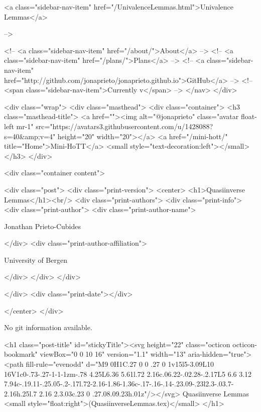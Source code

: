       
    
      
        
          <a class="sidebar-nav-item" href="/UnivalenceLemmas.html">Univalence Lemmas</a>
        
      
     -->

    <!-- <a class="sidebar-nav-item" href="/about/">About</a> -->
    <!-- <a class="sidebar-nav-item" href="/plans/">Plans</a> -->
    <!-- <a class="sidebar-nav-item" href="http://github.com/jonaprieto/jonaprieto.github.io">GitHub</a> -->
    <!-- <span class="sidebar-nav-item">Currently v</span> -->
  </nav>
</div>

    <div class="wrap">
      <div class="masthead">
        <div class="container">
          <h3 class="masthead-title">
            <a href=""><img alt="@jonaprieto" class="avatar float-left mr-1" src="https://avatars3.githubusercontent.com/u/1428088?s=40&amp;v=4" height="20" width="20"></a>
            <a href="/mini-hott/" title="Home">Mini-HoTT</a>
            <small style="text-decoration:left"></small>
          </h3>
        </div>
      
      <div class="container content">
        







<div class="post">
  <div class="print-version">
    <center>
      <h1>Quasiinverse Lemmas</h1><br/>
        <div class="print-authors">
          <div class="print-info">
            <div class="print-author">
              <div class="print-author-name">
                
                  Jonathan Prieto-Cubides
                
              </div>
              <div class="print-author-affiliation">
                
                  University of Bergen
                
                </div>
            </div>
          </div>
          
          
        </div>
        <div class="print-date"></div>
        
        
    </center>
  </div>

  
  No git information available.
  

  <h1 class="post-title" id="stickyTitle"><svg height="22" class="octicon octicon-bookmark" viewBox="0 0 10 16" version="1.1" width="13" aria-hidden="true"><path fill-rule="evenodd" d="M9 0H1C.27 0 0 .27 0 1v15l5-3.09L10 16V1c0-.73-.27-1-1-1zm-.78 4.25L6.36 5.61l.72 2.16c.06.22-.02.28-.2.17L5 6.6 3.12 7.94c-.19.11-.25.05-.2-.17l.72-2.16-1.86-1.36c-.17-.16-.14-.23.09-.23l2.3-.03.7-2.16h.25l.7 2.16 2.3.03c.23 0 .27.08.09.23h.01z"/></svg> Quasiinverse Lemmas <small style="float:right">(QuasiinverseLemmas.tex)</small>
  </h1>

